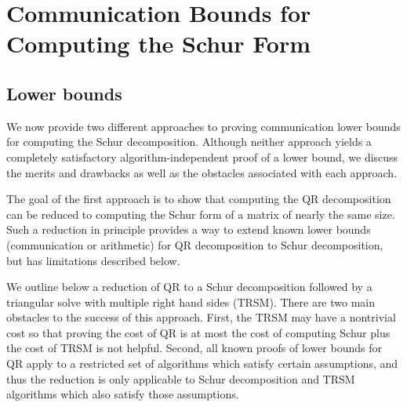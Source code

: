 \documentclass{article}
\theoremstyle{definition}
\begin{document}



\section{Communication Bounds for Computing the Schur Form} \label{cba}

\subsection{Lower bounds}

We now provide two different approaches to proving communication 
lower bounds for computing the Schur decomposition.  Although 
neither approach yields a completely satisfactory algorithm-independent
proof of a lower bound, we discuss the merits and drawbacks as well as 
the obstacles associated with each approach.

The goal of the first approach is to show that computing the 
QR decomposition can be reduced to computing the Schur form 
of a matrix of nearly the same size.  Such a reduction in
principle provides a way to extend known lower bounds 
(communication or arithmetic) for QR decomposition to 
Schur decomposition, but has limitations described below.

We outline below a reduction of QR to a Schur decomposition 
followed by a triangular solve with multiple right hand sides (TRSM).  
There are two main obstacles to the success of this approach.  
First, the TRSM may have a nontrivial cost so that proving the 
cost of QR is at most the cost of computing Schur plus the cost 
of TRSM is not helpful.  Second, all known proofs of lower bounds for 
QR apply to a restricted set of algorithms which satisfy certain 
assumptions, and thus the reduction is only applicable to 
Schur decomposition and TRSM algorithms which also satisfy those 
assumptions.
\end{document}
